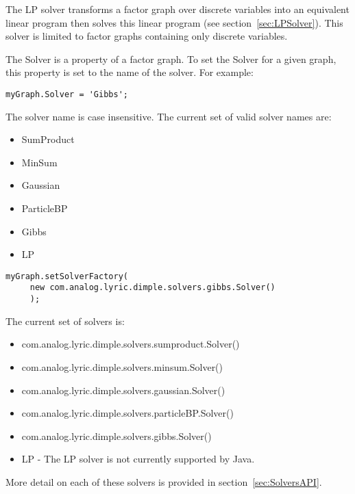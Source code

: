 The LP solver transforms a factor graph over discrete variables into an equivalent linear program then solves this linear program (see section~\ref{sec:LPSolver}).  This solver is limited to factor graphs containing only discrete variables.

The Solver is a property of a factor graph.  To set the Solver for a given graph, this property is set to the name of the solver.  For example:

\ifmatlab

\begin{lstlisting}
myGraph.Solver = 'Gibbs';
\end{lstlisting}

The solver name is case insensitive.  The current set of valid solver names are:

\begin{itemize}
\item SumProduct
\item MinSum
\item Gaussian
\item ParticleBP
\item Gibbs
\item LP
\end{itemize}

\fi

\ifjava

\begin{lstlisting}
myGraph.setSolverFactory(
     new com.analog.lyric.dimple.solvers.gibbs.Solver()
     );
\end{lstlisting}

The current set of solvers is:

\begin{itemize}
\item com.analog.lyric.dimple.solvers.sumproduct.Solver()
\item com.analog.lyric.dimple.solvers.minsum.Solver()
\item com.analog.lyric.dimple.solvers.gaussian.Solver()
\item com.analog.lyric.dimple.solvers.particleBP.Solver()
\item com.analog.lyric.dimple.solvers.gibbs.Solver()
\item LP - The LP solver is not currently supported by Java.
\end{itemize}

\fi

More detail on each of these solvers is provided in section~\ref{sec:SolversAPI}.

